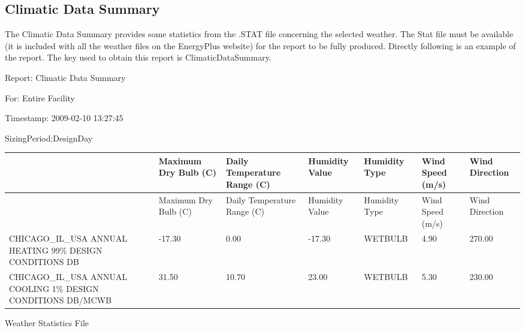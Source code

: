\subsection{Climatic Data Summary}\label{climatic-data-summary}

The Climatic Data Summary provides some statistics from the .STAT file concerning the selected weather. The Stat file must be available (it is included with all the weather files on the EnergyPlus website) for the report to be fully produced. Directly following is an example of the report. The key used to obtain this report is ClimaticDataSummary.

Report: Climatic Data Summary

For: Entire Facility

Timestamp: 2009-02-10 13:27:45

SizingPeriod:DesignDay

\begin{longtable}[c]{>{\raggedright}p{0.85in}>{\raggedright}p{0.85in}>{\raggedright}p{0.85in}>{\raggedright}p{0.85in}>{\raggedright}p{0.85in}>{\raggedright}p{0.85in}>{\raggedright}p{0.85in}}
\toprule 
~ & Maximum Dry Bulb (C) & Daily Temperature Range (C) & Humidity Value & Humidity Type & Wind Speed (m/s) & Wind Direction \tabularnewline
\midrule
\endfirsthead

\toprule 
~ & Maximum Dry Bulb (C) & Daily Temperature Range (C) & Humidity Value & Humidity Type & Wind Speed (m/s) & Wind Direction \tabularnewline
\midrule
\endhead

CHICAGO\-\_IL\-\_USA ANNUAL HEATING 99\% DESIGN CONDITIONS DB & -17.30 & 0.00 & -17.30 & WETBULB & 4.90 & 270.00 \tabularnewline
CHICAGO\-\_IL\-\_USA ANNUAL COOLING 1\% DESIGN CONDITIONS DB/MCWB & 31.50 & 10.70 & 23.00 & WETBULB & 5.30 & 230.00 \tabularnewline
\bottomrule
\end{longtable}

Weather Statistics File


